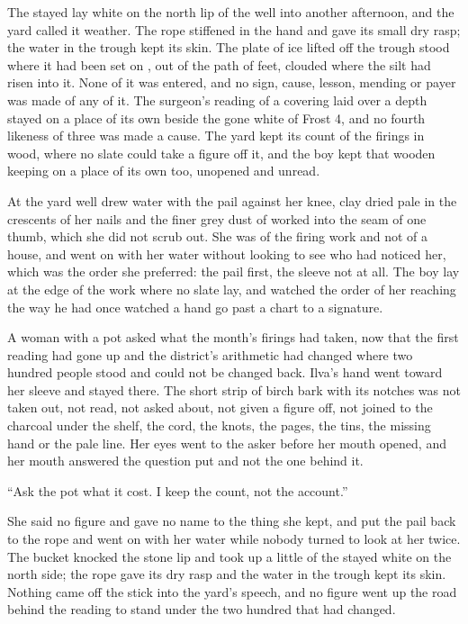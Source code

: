The stayed  lay white on the north lip of the well into another afternoon, and the yard called it weather. The rope stiffened in the hand and gave its small dry rasp; the water in the trough kept its skin. The plate of ice lifted off the trough stood where it had been set on , out of the path of feet, clouded where the silt had risen into it. None of it was entered, and no sign, cause, lesson, mending or payer was made of any of it. The surgeon's reading of a covering laid over a depth stayed on a place of its own beside the gone white of Frost 4, and no fourth likeness of three was made a cause. The yard kept its count of the firings in wood, where no slate could take a figure off it, and the boy kept that wooden keeping on a place of its own too, unopened and unread.

\scenebreak

At the yard well  drew water with the pail against her knee, clay dried pale in the crescents of her nails and the finer grey dust of  worked into the seam of one thumb, which she did not scrub out. She was of the firing work and not of a house, and went on with her water without looking to see who had noticed her, which was the order she preferred: the pail first, the sleeve not at all. The boy lay at the edge of the work where no slate lay, and watched the order of her reaching the way he had once watched a hand go past a chart to a signature.

A woman with a pot asked what the month's firings had taken, now that the first reading had gone up  and the district's arithmetic had changed where two hundred people stood and could not be changed back. Ilva's hand went toward her sleeve and stayed there. The short strip of birch bark with its notches was not taken out, not read, not asked about, not given a figure off, not joined to the charcoal under the shelf, the cord, the knots, the pages, the tins, the missing hand or the pale line. Her eyes went to the asker before her mouth opened, and her mouth answered the question put and not the one behind it.

“Ask the pot what it cost. I keep the count, not the account.”

She said no figure and gave no name to the thing she kept, and put the pail back to the rope and went on with her water while nobody turned to look at her twice. The bucket knocked the stone lip and took up a little of the stayed white on the north side; the rope gave its dry rasp and the water in the trough kept its skin. Nothing came off the stick into the yard's speech, and no figure went up the road behind the reading to stand under the two hundred that had changed.

